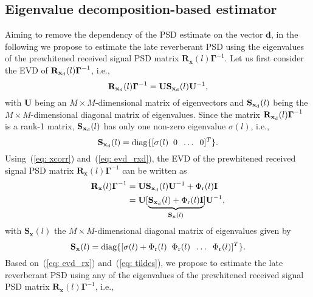 \documentclass{article}
\begin{document}
\subsection{Eigenvalue decomposition-based estimator}
\label{sec: evd}
Aiming to remove the dependency of the PSD estimate on the vector $\mathbf{d}$, in the following we propose to estimate the late reverberant PSD using the eigenvalues of the prewhitened received signal PSD matrix $\mathbf{R}_{\mathbf{x}}(l)\boldsymbol{\Gamma}^{-1}$.
Let us first consider the EVD of $\mathbf{R}_{{\mathbf{x}}_{\rm d}}(l)\boldsymbol{\Gamma}^{-1}$, i.e.,
\begin{equation}
\label{eq: evd_rxd}
\mathbf{R}_{{\mathbf{x}}_{\rm d}}(l)\boldsymbol{\Gamma}^{-1} = \mathbf{U} \mathbf{S}_{{\mathbf{x}}_{\rm d}}(l)\mathbf{U}^{-1},
\end{equation}
with $\mathbf{U}$ being an $M \times M$-dimensional matrix of eigenvectors and $\mathbf{S}_{{\mathbf{x}}_{\rm d}}(l)$ being the $M \times M$-dimensional diagonal matrix of eigenvalues.
Since the matrix $\mathbf{R}_{\mathbf{x}_{\rm d}}(l)\boldsymbol{\Gamma}^{-1}$ is a rank-1 matrix, $\mathbf{S}_{{\mathbf{x}}_{\rm d}}(l)$ has only one non-zero eigenvalue $\sigma(l)$, i.e., 
\begin{equation}
\mathbf{S}_{{\mathbf{x}}_{\rm d}}(l) = {\rm diag} \{[\sigma(l) \; \; 0 \; \; \ldots \;\; 0]^T \}.
\end{equation}
Using~(\ref{eq: xcorr}) and~(\ref{eq: evd_rxd}), the EVD of the prewhitened received signal PSD matrix $\mathbf{R}_{\mathbf{x}}(l)\boldsymbol{\Gamma}^{-1}$ can be written as
\begin{subequations}
\label{eq: evd_rx}
\begin{align}
\mathbf{R}_{\mathbf{x}}(l)\boldsymbol{\Gamma}^{-1}  & = \mathbf{U} \mathbf{S}_{{\mathbf{x}}_{\rm d}}(l) \mathbf{U}^{-1} + \Phi_{\rm r}(l)\mathbf{I} \\
& = \mathbf{U} [\underbrace{\mathbf{S}_{{\mathbf{x}}_{\rm d}}(l) + \Phi_{\rm r}(l)\mathbf{I}}_{\mathbf{S}_{\mathbf{x}}(l)}]\mathbf{U}^{-1},
\end{align}
\end{subequations}
with $\mathbf{S}_{\mathbf{x}}(l)$ the $M \times M$-dimensional diagonal matrix of eigenvalues given by
\begin{equation}
\label{eq: tildes}
\mathbf{S}_{\mathbf{x}}(l) = {\rm diag} \{[\sigma(l) + \Phi_{\rm r}(l) \; \; \Phi_{\rm r}(l) \;\; \ldots \;\; \Phi_{\rm r}(l)]^T \}.
\end{equation}
Based on~(\ref{eq: evd_rx}) and~(\ref{eq: tildes}), we propose to estimate the late reverberant PSD using any of the eigenvalues of the prewhitened received signal PSD matrix $\mathbf{R}_{\mathbf{x}}(l)\boldsymbol{\Gamma}^{-1}$, i.e.,
\end{document}
